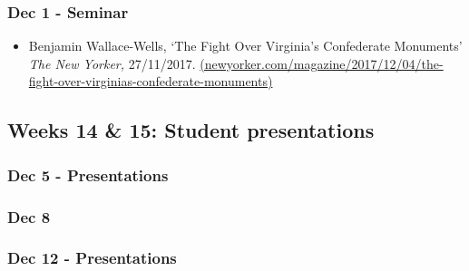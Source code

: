 \documentclass[12pt, a4paper]{article}
\begin{document}
\subsubsection*{Dec 1 - Seminar}

\begin{itemize}
\setlength\itemsep{0pt}
\item Benjamin Wallace-Wells, `The Fight Over Virginia’s Confederate Monuments' \textit{The New Yorker,} 27/11/2017. \href{https://www.newyorker.com/magazine/2017/12/04/the-fight-over-virginias-confederate-monuments}{(newyorker.com/magazine/2017/12/04/the-fight-over-virginias-confederate-monuments)}
\end{itemize}

\hline %

\subsection*{Weeks 14 \& 15: Student presentations}

\subsubsection*{Dec 5 - Presentations}

\subsubsection*{Dec 8 {}}

\subsubsection*{Dec 12 - Presentations}
\end{document}
